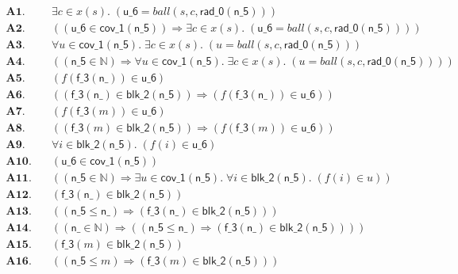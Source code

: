 \documentclass[11pt]{article}
\begin{document}
\begin{align*}
  \mathbf{A1.}\quad & \exists c \in x(s).\; (\mathsf{u\_6} = \mathit{ball}(s, c, \mathsf{rad\_0}(\mathsf{n\_5}))) \\
  \mathbf{A2.}\quad & ((\mathsf{u\_6} \in \mathsf{cov\_1}(\mathsf{n\_5})) \Rightarrow \exists c \in x(s).\; (\mathsf{u\_6} = \mathit{ball}(s, c, \mathsf{rad\_0}(\mathsf{n\_5})))) \\
  \mathbf{A3.}\quad & \forall u \in \mathsf{cov\_1}(\mathsf{n\_5}).\; \exists c \in x(s).\; (u = \mathit{ball}(s, c, \mathsf{rad\_0}(\mathsf{n\_5}))) \\
  \mathbf{A4.}\quad & ((\mathsf{n\_5} \in \mathbb{N}) \Rightarrow \forall u \in \mathsf{cov\_1}(\mathsf{n\_5}).\; \exists c \in x(s).\; (u = \mathit{ball}(s, c, \mathsf{rad\_0}(\mathsf{n\_5})))) \\
  \mathbf{A5.}\quad & (f(\mathsf{f\_3}(\mathsf{n\_})) \in \mathsf{u\_6}) \\
  \mathbf{A6.}\quad & ((\mathsf{f\_3}(\mathsf{n\_}) \in \mathsf{blk\_2}(\mathsf{n\_5})) \Rightarrow (f(\mathsf{f\_3}(\mathsf{n\_})) \in \mathsf{u\_6})) \\
  \mathbf{A7.}\quad & (f(\mathsf{f\_3}(m)) \in \mathsf{u\_6}) \\
  \mathbf{A8.}\quad & ((\mathsf{f\_3}(m) \in \mathsf{blk\_2}(\mathsf{n\_5})) \Rightarrow (f(\mathsf{f\_3}(m)) \in \mathsf{u\_6})) \\
  \mathbf{A9.}\quad & \forall i \in \mathsf{blk\_2}(\mathsf{n\_5}).\; (f(i) \in \mathsf{u\_6}) \\
  \mathbf{A10.}\quad & (\mathsf{u\_6} \in \mathsf{cov\_1}(\mathsf{n\_5})) \\
  \mathbf{A11.}\quad & ((\mathsf{n\_5} \in \mathbb{N}) \Rightarrow \exists u \in \mathsf{cov\_1}(\mathsf{n\_5}).\; \forall i \in \mathsf{blk\_2}(\mathsf{n\_5}).\; (f(i) \in u)) \\
  \mathbf{A12.}\quad & (\mathsf{f\_3}(\mathsf{n\_}) \in \mathsf{blk\_2}(\mathsf{n\_5})) \\
  \mathbf{A13.}\quad & ((\mathsf{n\_5} \leq \mathsf{n\_}) \Rightarrow (\mathsf{f\_3}(\mathsf{n\_}) \in \mathsf{blk\_2}(\mathsf{n\_5}))) \\
  \mathbf{A14.}\quad & ((\mathsf{n\_} \in \mathbb{N}) \Rightarrow ((\mathsf{n\_5} \leq \mathsf{n\_}) \Rightarrow (\mathsf{f\_3}(\mathsf{n\_}) \in \mathsf{blk\_2}(\mathsf{n\_5})))) \\
  \mathbf{A15.}\quad & (\mathsf{f\_3}(m) \in \mathsf{blk\_2}(\mathsf{n\_5})) \\
  \mathbf{A16.}\quad & ((\mathsf{n\_5} \leq m) \Rightarrow (\mathsf{f\_3}(m) \in \mathsf{blk\_2}(\mathsf{n\_5}))) \\

\end{align*}
\end{document}
